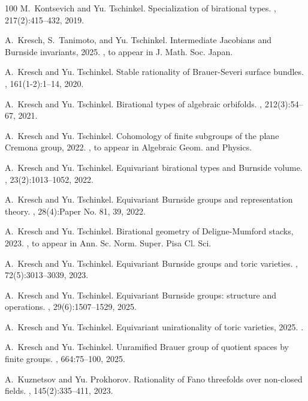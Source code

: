 \documentclass[12pt,reqno]{amsart}
\theoremstyle{plain}
\theoremstyle{remark}
\theoremstyle{definition}
\numberwithin{equation}{section}
\begin{document}
\begin{thebibliography}{100}
M.~Kontsevich and Yu. Tschinkel.
\newblock Specialization of birational types.
, 217(2):415--432, 2019.

A.~Kresch, S.~Tanimoto, and Yu. Tschinkel.
\newblock Intermediate {J}acobians and {B}urnside invariants, 2025.
, to appear in J. Math. Soc. Japan.

A.~Kresch and Yu. Tschinkel.
\newblock Stable rationality of {B}rauer-{S}everi surface bundles.
, 161(1-2):1--14, 2020.

A.~Kresch and Yu. Tschinkel.
\newblock Birational types of algebraic orbifolds.
, 212(3):54--67, 2021.

A.~Kresch and Yu. Tschinkel.
\newblock Cohomology of finite subgroups of the plane {C}remona group, 2022.
, to appear in Algebraic Geom. and Physics.

A.~Kresch and Yu. Tschinkel.
\newblock Equivariant birational types and {B}urnside volume.
, 23(2):1013--1052,
  2022.

A.~Kresch and Yu. Tschinkel.
\newblock Equivariant {B}urnside groups and representation theory.
, 28(4):Paper No. 81, 39, 2022.

A.~Kresch and Yu. Tschinkel.
\newblock Birational geometry of {D}eligne-{M}umford stacks, 2023.
, to appear in Ann. Sc. Norm. Super. Pisa Cl.
  Sci.

A.~Kresch and Yu. Tschinkel.
\newblock Equivariant {B}urnside groups and toric varieties.
, 72(5):3013--3039, 2023.

A.~Kresch and Yu. Tschinkel.
\newblock Equivariant {B}urnside groups: structure and operations.
, 29(6):1507--1529, 2025.

A.~Kresch and Yu. Tschinkel.
\newblock Equivariant unirationality of toric varieties, 2025.
.

A.~Kresch and Yu. Tschinkel.
\newblock Unramified {B}rauer group of quotient spaces by finite groups.
, 664:75--100, 2025.

A.~Kuznetsov and Yu. Prokhorov.
\newblock Rationality of {F}ano threefolds over non-closed fields.
, 145(2):335--411, 2023.


\end{thebibliography}
\end{document}
